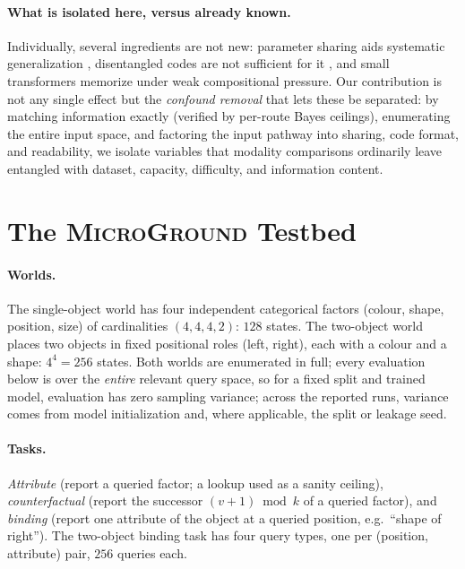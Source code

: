 \documentclass[10pt]{article} %
\newcommand{\microground}{\textsc{MicroGround}}
\begin{document}
\paragraph{What is isolated here, versus already known.} Individually, several ingredients are not
new: parameter sharing aids systematic generalization \citep{csordas2021devil}, disentangled codes
are not sufficient for it \citep{montero2021role}, and small transformers memorize under weak
compositional pressure. Our contribution is not any single effect but the \emph{confound removal}
that lets these be separated: by matching information exactly (verified by per-route Bayes
ceilings), enumerating the entire input space, and factoring the input pathway into sharing, code
format, and readability, we isolate variables that modality comparisons ordinarily leave entangled
with dataset, capacity, difficulty, and information content.

\section{The \microground{} Testbed}
\label{sec:testbed}
\paragraph{Worlds.} The single-object world has four independent categorical factors (colour,
shape, position, size) of cardinalities $(4,4,4,2)$: $128$ states. The two-object world places two
objects in fixed positional roles (left, right), each with a colour and a shape: $4^4 = 256$
states. Both worlds are enumerated in full; every evaluation below is over the \emph{entire}
relevant query space, so for a fixed split and trained model, evaluation has zero sampling variance;
across the reported runs, variance comes from model initialization and, where applicable, the split
or leakage seed.

\paragraph{Tasks.} \emph{Attribute} (report a queried factor; a lookup used as a sanity ceiling),
\emph{counterfactual} (report the successor $(v{+}1) \bmod k$ of a queried factor), and
\emph{binding} (report one attribute of the object at a queried position, e.g.\ ``shape of
right''). The two-object binding task has four query types, one per (position, attribute) pair,
$256$ queries each.
\end{document}
